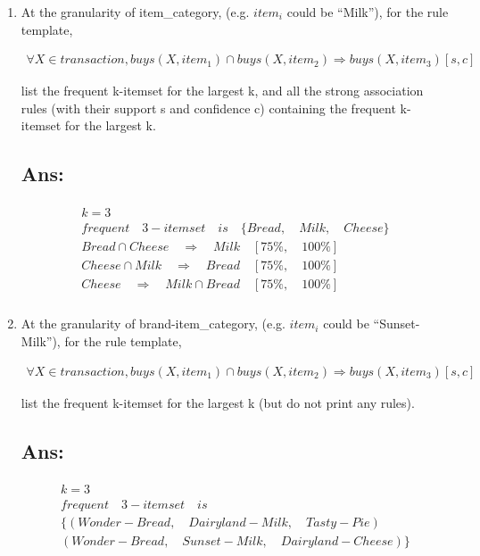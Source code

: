 \begin{enumerate}[label=(\alph*)]

	\item At the granularity of item\_category, (e.g. $item_i$ could be ``Milk''), for the rule template,
	
	\begin{align*}
		\forall X \in transaction, buys(X, item_1) \cap buys(X, item_2) \Rightarrow buys(X, item_3)		[s, c]
	\end{align*}

	list the frequent k-itemset for the largest k, and all the strong association rules 
	(with their support s and confidence c) containing the frequent k-itemset for the largest k.
	
	\subsection*{Ans:}

	\begin{align*}
	\begin{gathered}
		k = 3 \\
		frequent \quad 3 - itemset \quad is \quad \{Bread, \quad Milk, \quad Cheese\} \\
		Bread \cap Cheese \quad \Rightarrow \quad Milk \quad [75\%, \quad 100\%] \\
		Cheese \cap Milk \quad \Rightarrow \quad Bread \quad [75\%, \quad 100\%] \\
		Cheese \quad \Rightarrow \quad Milk \cap Bread \quad [75\%, \quad 100\%] \\
	\end{gathered}
	\end{align*}

\clearpage

	\item At the granularity of brand-item\_category, (e.g. $item_i$ could be ``Sunset-Milk''), for the rule template, 
	
	\begin{align*}
		\forall X \in transaction, buys(X, item_1) \cap buys(X, item_2) \Rightarrow buys(X, item_3)		[s, c]
	\end{align*}

	list the frequent k-itemset for the largest k (but do not print any rules).

	\subsection*{Ans:}

	\begin{align*}
	\begin{gathered}
		k = 3 \\
		frequent \quad 3 - itemset \quad is \\ \{(Wonder-Bread, \quad Dairyland-Milk, 
		\quad Tasty-Pie) \\ (Wonder-Bread, \quad Sunset-Milk, \quad Dairyland-Cheese)\}
	\end{gathered}
	\end{align*}

\end{enumerate}

